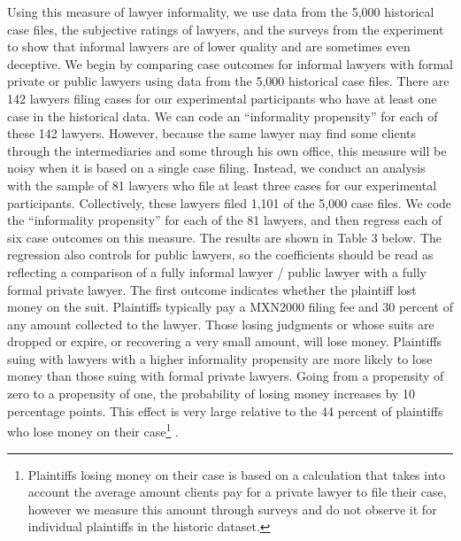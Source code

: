 \documentclass[12 pt]{article}
\begin{document}
Using this measure of lawyer informality, we use data from the 5,000 historical case files, the subjective ratings of lawyers, and the surveys from the experiment to show that informal lawyers are of lower quality and are sometimes even deceptive. We begin by comparing case outcomes for informal lawyers with formal private or public lawyers using data from the 5,000 historical case files. There are 142 lawyers filing cases for our experimental participants who have at least one case in the historical data. We can code an “informality propensity” for each of these 142 lawyers. However, because the same lawyer may find some clients through the intermediaries and some through his own office, this measure will be noisy when it is based on a single case filing. Instead, we conduct an analysis with the sample of 81 lawyers who file at least three cases for our experimental participants. Collectively, these lawyers filed 1,101 of the 5,000 case files. We code the “informality propensity” for each of the 81 lawyers, and then regress each of six case outcomes on this measure. The results are shown in Table 3 below. The regression also controls for public lawyers, so the coefficients should be read as reflecting a comparison of a fully informal lawyer / public lawyer with a fully formal private lawyer. The first outcome indicates whether the plaintiff lost money on the suit. Plaintiffs typically pay a MXN2000 filing fee and 30 percent of any amount collected to the lawyer. Those losing judgments or whose suits are dropped or expire, or recovering a very small amount, will lose money. Plaintiffs suing with lawyers with a higher informality propensity are more likely to lose money than those suing with formal private lawyers. Going from a propensity of zero to a propensity of one, the probability of losing money increases by 10 percentage points. This effect is very large relative to the 44 percent of plaintiffs who lose money on their case\footnote{Plaintiffs losing money on their case is based on a calculation that takes into account the average amount clients pay for a private lawyer to file their case, however we measure this amount through surveys and do not observe it for individual plaintiffs in the historic dataset.} . 
\end{document}
